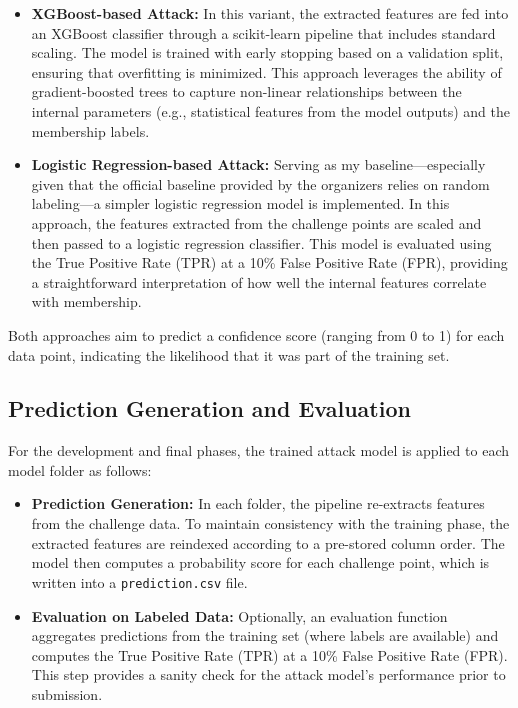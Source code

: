 \documentclass[12pt]{article}
\begin{document}
\begin{itemize}
    \item \textbf{XGBoost-based Attack:}  
    In this variant, the extracted features are fed into an XGBoost classifier through a scikit-learn pipeline that includes standard scaling. The model is trained with early stopping based on a validation split, ensuring that overfitting is minimized. This approach leverages the ability of gradient-boosted trees to capture non-linear relationships between the internal parameters (e.g., statistical features from the model outputs) and the membership labels.

    \item \textbf{Logistic Regression-based Attack:}  
    Serving as my baseline—especially given that the official baseline provided by the organizers relies on random labeling—a simpler logistic regression model is implemented. In this approach, the features extracted from the challenge points are scaled and then passed to a logistic regression classifier. This model is evaluated using the True Positive Rate (TPR) at a 10\% False Positive Rate (FPR), providing a straightforward interpretation of how well the internal features correlate with membership.
\end{itemize}

Both approaches aim to predict a confidence score (ranging from 0 to 1) for each data point, indicating the likelihood that it was part of the training set.

\subsection{Prediction Generation and Evaluation}
For the development and final phases, the trained attack model is applied to each model folder as follows:

\begin{itemize}
    \item \textbf{Prediction Generation:} In each folder, the pipeline re-extracts features from the challenge data. To maintain consistency with the training phase, the extracted features are reindexed according to a pre-stored column order. The model then computes a probability score for each challenge point, which is written into a \texttt{prediction.csv} file.
    
    \item \textbf{Evaluation on Labeled Data:} Optionally, an evaluation function aggregates predictions from the training set (where labels are available) and computes the True Positive Rate (TPR) at a 10\% False Positive Rate (FPR). This step provides a sanity check for the attack model's performance prior to submission.
\end{itemize}
\end{document}
